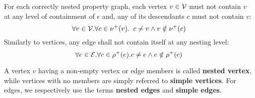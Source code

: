 \begin{axiom}
	For each correctly nested property graph, each vertex $v\in \mathcal{V}$ must not contain $v$ at any level of containment of $\epsilon$ and, any of its descendants $c$ must not contain $v$:
	\[\forall v\in \mathcal{V}. \forall c\in \nu^+(v).\;\; c\neq v\wedge v\notin \nu^+(c)\]
	Similarly to vertices, any edge shall not contain itself at any nesting level:
	\[\forall e\in \mathcal{E}. \forall c\in \rho^+(e). c\neq e\wedge e\notin \rho^+(c)\]
\end{axiom}

A vertex $v$ having a non-empty vertex or edge members is called \textbf{nested vertex}, while vertices with no members are simply referred to \textbf{simple vertices}. For edges, we respectively use the terms \textbf{nested edges} and \textbf{simple edges}. 
